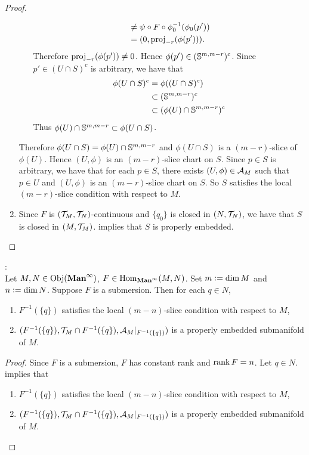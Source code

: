 \documentclass{book}
\begin{document}
\begin{proof}
\begin{enumerate}
\begin{itemize}
\begin{align*}
					& \neq \psi \circ F \circ \phi_0^{-1}(\phi_0(p')) \\
					& = (0, \prj_{-r}(\phi(p'))).
				\end{align*}
				Therefore $\prj_{-r}(\phi(p')) \neq 0$. Hence $\phi(p') \in (\S^{m, m-r})^c$. Since $p' \in (U \cap S)^c$ is arbitrary, we have that 
				\begin{align*}
					\phi(U \cap S)^c
					& = \phi((U \cap S)^c) \\
					& \subset (\S^{m, m-r})^c \\
					& \subset (\phi(U) \cap \S^{m, m-r})^c
				\end{align*}
				Thus $\phi(U) \cap \S^{m, m-r} \subset \phi(U \cap S)$. 
			\end{itemize}
			Therefore $\phi(U \cap S) = \phi(U) \cap \S^{m, m-r}$ and $\phi(U \cap S)$ is a $(m-r)$-slice of $\phi(U)$. Hence $(U, \phi)$ is an $(m-r)$-slice chart on $S$. Since $p \in S$ is arbitrary, we have that for each $p \in S$, there exists $(U, \phi) \in \MA_M$ such that $p \in U$ and $(U, \phi)$ is an $(m-r)$-slice chart on $S$. So $S$ satisfies the local $(m-r)$-slice condition with respect to $M$.  
			\item Since $F$ is $(\MT_M, \MT_N)$-continuous and $\{q_0\}$ is closed in $(N, \MT_N)$, we have that $S$ is closed in $(M, \MT_M)$. \rex{}  implies that $S$ is properly embedded.
		\end{enumerate}
	\end{proof}
	
	\begin{ex}  : \\
		Let $M, N \in \Obj(\Maninf)$, $F \in \Hom_{\Maninf}(M,N)$. Set $m \defeq \dim M$ and $n \defeq \dim N$. Suppose $F$ is a submersion. Then for each $q \in N$, 
		\begin{enumerate}
			\item $F^{-1}(\{q\})$ satisfies the local $(m-n)$-slice condition with respect to $M$,
			\item $(F^{-1}(\{q\}), \MT_M \cap F^{-1}(\{q\}), \MA_M|_{F^{-1}(\{q\})})$ is a properly embedded submanifold of $M$.
		\end{enumerate}
	\end{ex}

	\begin{proof}
		Since $F$ is a submersion, $F$ has constant rank and $\rnk F = n$. Let $q \in N$. \rex{}  implies that 
		\begin{enumerate}
			\item $F^{-1}(\{q\})$ satisfies the local $(m-n)$-slice condition with respect to $M$,
			\item $(F^{-1}(\{q\}), \MT_M \cap F^{-1}(\{q\}), \MA_M|_{F^{-1}(\{q\})})$ is a properly embedded submanifold of $M$.
		\end{enumerate}
	\end{proof}
	
\end{document}
